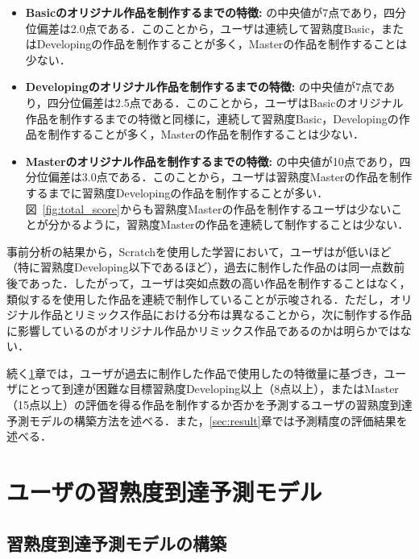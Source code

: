 \documentclass[submit]{ipsj}
\begin{document}
\begin{itemize}
\item \textbf{Basicのオリジナル作品を制作するまでの特徴: }\textcolor{red}{}の中央値が7点であり，四分位偏差は2.0点である．このことから，ユーザは連続して習熟度Basic，またはDevelopingの作品を制作することが多く，Masterの作品を制作することは少ない．
\item \textbf{Developingのオリジナル作品を制作するまでの特徴: }\textcolor{red}{}の中央値が7点であり，四分位偏差は2.5点である．このことから，ユーザはBasicのオリジナル作品を制作するまでの特徴と同様に，連続して習熟度Basic，Developingの作品を制作することが多く，Masterの作品を制作することは少ない．
\item \textbf{Masterのオリジナル作品を制作するまでの特徴: }\textcolor{red}{}の中央値が10点であり，四分位偏差は3.0点である．このことから，ユーザは習熟度Masterの作品を制作するまでに習熟度Developingの作品を制作することが多い．図~\ref{fig:total_score}からも習熟度Masterの作品を制作するユーザは少ないことが分かるように，習熟度Masterの作品を連続して制作することは少ない．
\end{itemize}

事前分析の結果から，Scratchを使用した学習において，ユーザは\textcolor{red}{}が低いほど（特に習熟度Developing以下であるほど），過去に制作した作品の\textcolor{red}{}は同一点数前後であった．したがって，ユーザは突如点数の高い作品を制作することはなく，類似する\textcolor{red}{}を使用した作品を連続で制作していることが示唆される．ただし，オリジナル作品とリミックス作品における分布は異なることから，次に制作する作品に影響しているのがオリジナル作品かリミックス作品であるのかは明らかではない．

続く\ref{sec:method}章では，ユーザが過去に制作した作品で使用した\textcolor{red}{}の特徴量に基づき，ユーザにとって到達が困難な目標習熟度Developing以上（8点以上），またはMaster（15点以上）の評価を得る作品を制作するか否かを予測するユーザの習熟度到達予測モデルの構築方法を述べる．また，\ref{sec:result}章では予測精度の評価結果を述べる．


\section{ユーザの習熟度到達予測モデル}\label{sec:method}

\subsection{習熟度到達予測モデルの構築}
\end{document}

